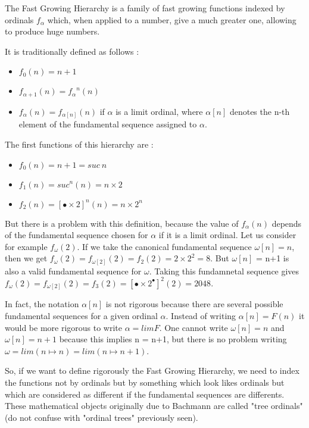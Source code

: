 \documentclass[10pt]{article}
\begin{document}
The Fast Growing Hierarchy is a family of fast growing functions indexed by ordinals \( f_\alpha \) which, when applied to a number, give a much greater one, allowing to produce huge numbers.

It is traditionally defined as follows :

\begin{itemize}
     \setlength{\itemsep}{1pt}
     \setlength{\parskip}{0pt}
     \setlength{\parsep}{0pt}
\item \( f_0(n) = n+1 \)
\item \( f_{\alpha+1}(n) = {f_\alpha}^n(n) \)
\item \( f_\alpha(n) = f_{\alpha[n]}(n) \) if \( \alpha \) is a limit ordinal, where \( \alpha[n] \) denotes the n-th element of the fundamental sequence assigned to \( \alpha \).
\end{itemize}

The first functions of this hierarchy are :

\begin{itemize}
     \setlength{\itemsep}{1pt}
     \setlength{\parskip}{0pt}
     \setlength{\parsep}{0pt}
\item \( f_0(n) = n+1 = suc\ n \)
\item \( f_1(n) = suc^n(n) = n \times 2 \)
\item \( f_2(n) = [\bullet \times 2]^n(n) = n \times 2^n \)
\end{itemize}

But there is a problem with this definition, because the value of \( f_\alpha(n) \) depends of the fundamental sequence chosen for \( \alpha \) if it is a limit ordinal. Let us consider for example \( f_\omega(2) \). If we take the canonical fundamental sequence \( \omega[n] = n \), then we get \( f_\omega(2) = f_{\omega[2]}(2) = f_2(2) = 2 \times 2^2 = 8 \). But \( \omega[n] \) = n+1 is also a valid fundamental sequence for \( \omega \). Taking this fundamnetal sequence gives \( f_\omega(2) = f_{\omega[2]}(2) = f_3(2) = [\bullet \times 2^\bullet]^2(2) = 2048 \).

In fact, the notation \( \alpha[n] \) is not rigorous because there are several possible fundamental sequences for a given ordinal \( \alpha \). Instead of writing \( \alpha[n] = F(n) \) it would be more rigorous to write \( \alpha = lim F \). One cannot write \( \omega[n] = n \) and \( \omega[n] = n+1 \) because this implies n = n+1, but there is no problem writing \( \omega = lim (n \mapsto n) = lim (n \mapsto n+1) \).

So, if we want to define rigorously the Fast Growing Hierarchy, we need to index the functions not by ordinals but by something which look likes ordinals but which are considered as different if the fundamental sequences are differents. These mathematical objects originally due to Bachmann are called "tree ordinals" (do not confuse with "ordinal trees" previously seen). 
\end{document}

